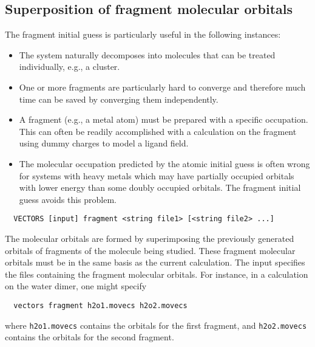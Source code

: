 \subsection{Superposition of fragment molecular orbitals}
\label{sec:fragguess}

The fragment initial guess is particularly useful in the following
instances:
\begin{itemize}
\item The system naturally decomposes into molecules that can be
  treated individually, e.g., a cluster.
\item One or more fragments are particularly hard to converge and
  therefore much time can be saved by converging them independently.
\item A fragment (e.g., a metal atom) must be prepared with a specific
  occupation.  This can often be readily accomplished with a
  calculation on the fragment using dummy charges to model a ligand
  field.
\item The molecular occupation predicted by the atomic initial guess
  is often wrong for systems with heavy metals which may have
  partially occupied orbitals with lower energy than some doubly
  occupied orbitals.  The fragment initial guess avoids this problem.
\end{itemize}

\begin{verbatim}
  VECTORS [input] fragment <string file1> [<string file2> ...]
\end{verbatim}
The molecular orbitals are formed by superimposing the previously
generated orbitals of fragments of the molecule being studied.  These
fragment molecular orbitals must be in the same basis as the current
calculation.  The input specifies the files containing the fragment
molecular orbitals.  For instance, in a calculation on the water
dimer, one might specify
\begin{verbatim}
  vectors fragment h2o1.movecs h2o2.movecs
\end{verbatim}
where \verb+h2o1.movecs+ contains the orbitals for the first fragment, and
\verb+h2o2.movecs+ contains the orbitals for the second fragment.

